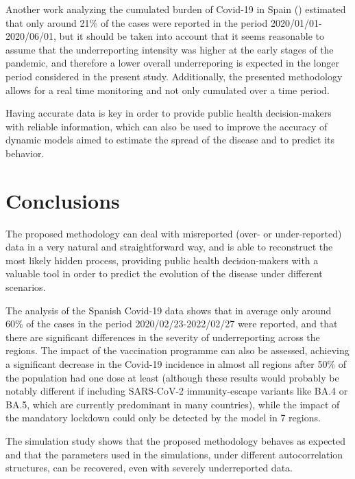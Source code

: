 \documentclass{bmcart}
\begin{document}
Another work analyzing the cumulated burden of Covid-19 in Spain (\cite{morina_cumulated_2021}) estimated that only around 21\% of the cases were reported in the period 2020/01/01-2020/06/01, but it should be taken into account that it seems reasonable to assume that the underreporting intensity was higher at the early stages of the pandemic, and therefore a lower overall underreporing is expected in the longer period considered in the present study. Additionally, the presented methodology allows for a real time monitoring and not only cumulated over a time period.

Having accurate data is key in order to provide public health decision-makers with reliable information, which can also be used to improve the accuracy of dynamic models aimed to estimate the spread of the disease \cite{Zhao2020} and to predict its behavior. 

\section*{Conclusions}\label{conclusions}
The proposed methodology can deal with misreported (over- or under-reported) data in a very natural and straightforward way, and is able to reconstruct the most likely hidden process, providing public health decision-makers with a valuable tool in order to predict the evolution of the disease under different scenarios.

The analysis of the Spanish Covid-19 data shows that in average only around 60\% of the cases in the period 2020/02/23-2022/02/27 were reported, and that there are significant differences in the severity of underreporting across the regions. The impact of the vaccination programme can also be assessed, achieving a significant decrease in the Covid-19 incidence in almost all regions after 50\% of the population had one dose at least (although these results would probably be notably different if including SARS-CoV-2 immunity-escape variants like BA.4 or BA.5, which are currently predominant in many countries), while the impact of the mandatory lockdown could only be detected by the model in 7 regions.

The simulation study shows that the proposed methodology behaves as expected and that the parameters used in the simulations, under different autocorrelation structures, can be recovered, even with severely underreported data.
\end{document}
